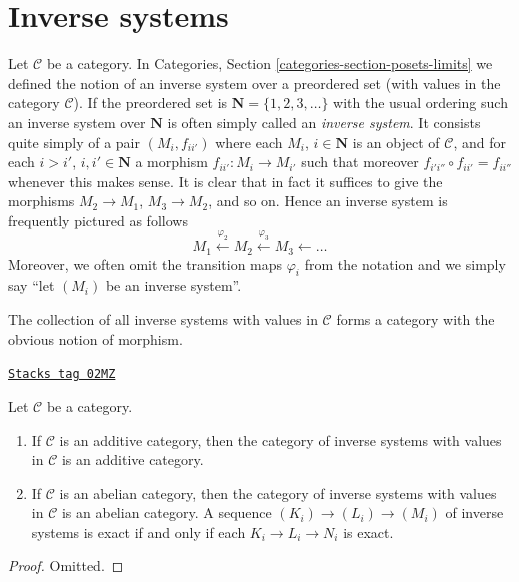 \section{Inverse systems}
\label{homology-section-inverse-systems}
Let $\mathcal{C}$ be a category.
In Categories, Section \ref{categories-section-posets-limits}
we defined the notion of an inverse system over a preordered set
(with values in the category $\mathcal{C}$).
If the preordered set is $\mathbf{N} = \{1, 2, 3, \ldots\}$
with the usual ordering such an inverse system over $\mathbf{N}$
is often simply called an {\it inverse system}. It consists quite simply
of a pair $(M_i, f_{ii'})$ where each $M_i$, $i \in \mathbf{N}$
is an object of $\mathcal{C}$, and for each $i > i'$, $i, i' \in \mathbf{N}$
a morphism $f_{ii'} : M_i \to M_{i'}$ such that moreover
$f_{i'i''} \circ f_{ii'} = f_{ii''}$ whenever this makes sense.
It is clear that in fact it suffices to give the morphisms
$M_2 \to M_1$, $M_3 \to M_2$, and so on. Hence an inverse system
is frequently pictured as follows
$$
M_1 \xleftarrow{\varphi_2} M_2 \xleftarrow{\varphi_3} M_3 \leftarrow \ldots
$$
Moreover, we often omit the transition maps $\varphi_i$ from the notation
and we simply say ``let $(M_i)$ be an inverse system''.

\medskip\noindent
The collection of all inverse systems with values in
$\mathcal{C}$ forms a category with the obvious notion of morphism.

\begin{lemma}
\label{homology-lemma-inverse-systems-abelian}
\href{https://stacks.math.columbia.edu/tag/02MZ}{\texttt{Stacks tag 02MZ}}

Let $\mathcal{C}$ be a category.
\begin{enumerate}
\item If $\mathcal{C}$ is an additive category, then the category
of inverse systems with values in $\mathcal{C}$ is an additive category.
\item If $\mathcal{C}$ is an abelian category, then the category
of inverse systems with values in $\mathcal{C}$ is an abelian category.
A sequence $(K_i) \to (L_i) \to (M_i)$ of inverse systems
is exact if and only if each $K_i \to L_i \to N_i$ is exact.
\end{enumerate}
\end{lemma}

\begin{proof}
Omitted.
\end{proof}

